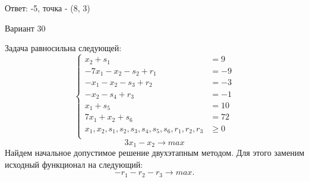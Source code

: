 \documentclass{article}%
\begin{document}
\begin{flushright}%
Ответ: {-}5, точка {-} (8, 3)%
\end{flushright}%
\newpage%
\begin{center}%
\begin{Huge}%
Вариант 30%
\end{Huge}%
\end{center}%
Задача равносильна следующей: %
\[%
\left\{\begin{aligned}x_{2}+s_{1} & =9 \\-7x_{1}-x_{2}-s_{2}+r_{1} & =-9 \\-x_{1}-x_{2}-s_{3}+r_{2} & =-3 \\-x_{2}-s_{4}+r_{3} & =-1 \\x_{1}+s_{5} & =10 \\7x_{1}+x_{2}+s_{6} & =72 \\x_{1},x_{2},s_{1},s_{2},s_{3},s_{4},s_{5},s_{6},r_{1},r_{2},r_{3} & \ge 0 \\ \end{aligned}\right.%
\]%
\[%
3x_{1}-x_{2}  \to max%
\]%
Найдем начальное допустимое решение двухэтапным методом. Для этого заменим исходный функционал на следующий: %
\[%
-r_{1}-r_{2}-r_{3}\to max.%
\]%
\end{document}
